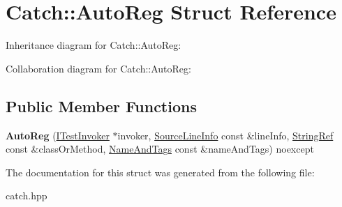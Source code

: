 \hypertarget{structCatch_1_1AutoReg}{}\section{Catch\+:\+:Auto\+Reg Struct Reference}
\label{structCatch_1_1AutoReg}


Inheritance diagram for Catch\+:\+:Auto\+Reg\+:


Collaboration diagram for Catch\+:\+:Auto\+Reg\+:
\subsection*{Public Member Functions}
\begin{DoxyCompactItemize}
\item 
{\bfseries Auto\+Reg} (\hyperlink{structCatch_1_1ITestInvoker}{I\+Test\+Invoker} $\ast$invoker, \hyperlink{structCatch_1_1SourceLineInfo}{Source\+Line\+Info} const \&line\+Info, \hyperlink{classCatch_1_1StringRef}{String\+Ref} const \&class\+Or\+Method, \hyperlink{structCatch_1_1NameAndTags}{Name\+And\+Tags} const \&name\+And\+Tags) noexcept\hypertarget{structCatch_1_1AutoReg_a7eba02fb9d80b9896bf5a6517369af28}{}\label{structCatch_1_1AutoReg_a7eba02fb9d80b9896bf5a6517369af28}

\end{DoxyCompactItemize}


The documentation for this struct was generated from the following file\+:\begin{DoxyCompactItemize}
\item 
catch.\+hpp\end{DoxyCompactItemize}
